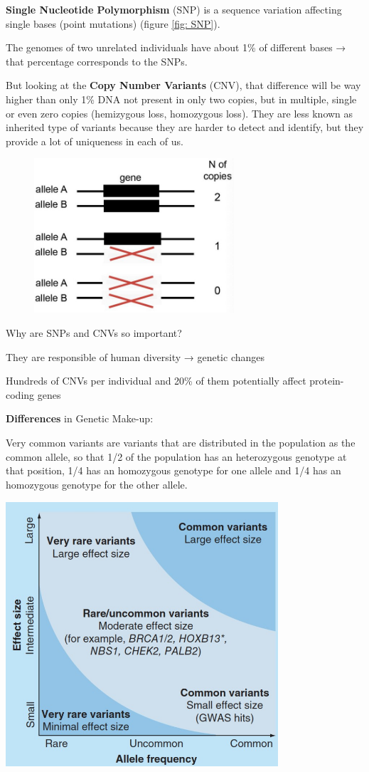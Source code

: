 \textbf{Single Nucleotide Polymorphism} (SNP) is a sequence variation affecting
single bases (point mutations) (figure \ref{fig: SNP}).

The genomes of two unrelated individuals have about 1\% of different bases →
that percentage corresponds to the SNPs.

But looking at the \textbf{Copy Number Variants} (CNV), that difference will be
way higher than only 1\% DNA not present in only two copies, but in multiple,
single or even zero copies (hemizygous loss, homozygous loss). They are less
known as inherited type of variants because they are harder to detect and
identify, but they provide a lot of uniqueness in each of us.


\begin{figure}[H]
  \includegraphics[width=2.93475in,height=2.26167in]{image3.jpeg} 
  \centering
  \caption{}
  \label{fig: SNP2}
\end{figure}


Why are SNPs and CNVs so important?

They are responsible of human diversity → genetic changes

Hundreds of CNVs per individual and 20\% of them potentially affect protein-
coding genes

\textbf{Differences} in Genetic Make-up:

Very common variants are variants that are distributed in the population as the
common allele, so that 1/2 of the population has an heterozygous genotype at
that position, 1/4 has an homozygous genotype for one allele and 1/4 has an
homozygous genotype for the other allele.

\includegraphics[width=3.9928in,height=3.87812in]{image4.jpeg}

